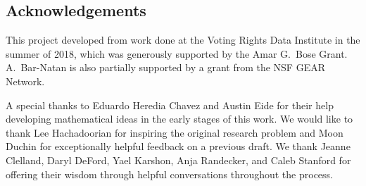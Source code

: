 \subsection*{Acknowledgements}
This project developed from work done at the Voting Rights Data Institute in the summer of 2018, which was generously supported by the Amar G.\ Bose Grant.  A.\ Bar-Natan is also partially supported by a grant from the NSF GEAR Network.

A special thanks to Eduardo Heredia Chavez and Austin Eide for their help developing mathematical ideas in the early stages of this work. We would like to thank Lee Hachadoorian for inspiring the original research problem and Moon Duchin for exceptionally helpful feedback on a previous draft.  We thank Jeanne Clelland, Daryl DeFord, Yael Karshon, Anja Randecker, and Caleb Stanford for offering their wisdom through helpful conversations throughout the process.